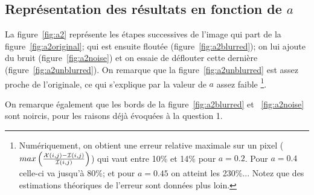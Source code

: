 \subsection{Représentation des résultats en fonction de $a$}
La figure~\ref{fig:a2} représente les étapes successives de l'image qui part
de la figure~\ref{fig:a2original}; qui est ensuite floutée (figure~\ref{fig:a2blurred});
on lui ajoute du bruit (figure~\ref{fig:a2noise}) et on essaie de déflouter cette dernière (figure~\ref{fig:a2unblurred}).
On remarque que la figure~\ref{fig:a2unblurred} est assez proche de l'originale, ce qui s'explique par la valeur de $a$ assez faible \footnote{Numériquement, on obtient une erreur relative maximale sur un pixel ($max\left( \frac{\mathcal{X} (i,j) - \mathcal{I}(i,j)}{\mathcal{I} (i,j)} \right)$) qui vaut entre 10\% et 14\% pour $a=0.2$. Pour $a=0.4$ celle-ci va jusqu'à 80\%; et pour $a=0.45$ on atteint les 230\%... Notez que des estimations théoriques de l'erreur sont données plus loin.}.

On remarque également que les bords de la figure~\ref{fig:a2blurred} et ~\ref{fig:a2noise}
sont noircis, pour les raisons déjà évoquées à la question 1.

